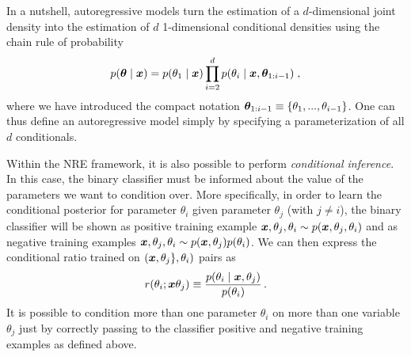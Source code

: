 In a nutshell, autoregressive models turn the estimation of a $d$-dimensional joint density into the estimation of $d$ 1-dimensional conditional densities using the chain rule of probability
\begin{equation}\label{eq:anre-autoregressive}
    p(\bm{\theta} \mid\bm{x}) =  p(\theta_1\mid\bm{x}) \prod_{i=2}^d p(\theta_i\mid\bm{x}, \bm{\theta}_{1:i-1})\;,
\end{equation}
where we have introduced the compact notation $\bm{\theta}_{1:i-1} \equiv \{\theta_1, ..., \theta_{i-1}\}$. One can thus define an autoregressive model simply by specifying a parameterization of all $d$ conditionals.

Within the NRE framework, it is also possible to perform \emph{conditional inference}. In this case, the binary classifier must be informed about the value of the parameters we want to condition over. More specifically, in order to learn the conditional posterior for parameter $\theta_i$ given parameter $\theta_j$ (with $j \neq i$), the binary classifier will be shown as positive training example $\bm{x}, \theta_j, \theta_i \sim p(\bm{x}, \theta_j, \theta_i)$ and as negative training examples $\bm{x}, \theta_j, \theta_i \sim p(\bm{x}, \theta_j)p(\theta_i)$. We can then express the conditional ratio trained on $(\bm{x}, \theta_j\}, \theta_i)$ pairs as
\begin{equation}
    \label{eq:ratio_conditional}
    r(\theta_i;\bm{x} \theta_j) \equiv
    \frac{p(\theta_i \mid \bm{x}, \theta_j)}{ p(\theta_i)} \, .
\end{equation}
It is possible to condition more than one parameter $\theta_i$ on more than one variable $\theta_j$ just by correctly passing to the classifier positive and negative training examples as defined above. 

